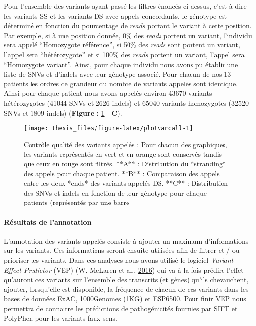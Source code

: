 \documentclass[12pt,twoside]{reedthesis}
\theoremstyle{definition}
\theoremstyle{definition}
\theoremstyle{remark}
\begin{document}
  Pour l'ensemble des variants ayant passé les filtres énoncés ci-dessus,
  c'est à dire les variants SS et les variants DS avec appels concordants,
  le génotype est déterminé en fonction du pourcentage de \emph{reads}
  portant le variant à cette position. Par exemple, si à une position
  donnée, 0\% des \emph{reads} portent un variant, l'individu sera appelé
  ``Homozygote référence'', si 50\% des \emph{reads} sont portent un
  variant, l'appel sera ``hétérozygote'' et si 100\% des \emph{reads}
  portent un variant, l'appel sera ``Homozygote variant''. Ainsi, pour
  chaque individu nous avons pu établir une liste de SNVs et d'indels avec
  leur génotype associé. Pour chacun de nos 13 patients les ordres de
  grandeur du nombre de variants appelés sont identique. Ainsi pour chaque
  patient nous avons appelés environ 43670 variants hétérozygotes (41044
  SNVs et 2626 indels) et 65040 variants homozygotes (32520 SNVs et 1809
  indels) (\textbf{Figure : }\ref{fig:plotvarcall} - \textbf{C}).
  
  \newpage
  
  \begin{figure}
  
  {\centering \texttt{[image: thesis\_files/figure-latex/plotvarcall-1]} 
  
  }
  
  \caption[Contrôle qualité des variants appelés]{Contrôle qualité des variants appelés : Pour chacun des graphiques, les variants représentés en vert et en orange sont conservés tandis que ceux en rouge sont filtrés. **A** : Distribution du *stranding* des appels pour chaque patient. **B** : Comparaison des appels entre les deux *ends* des variants appelés DS. **C** : Distribution des SNVs et indels en fonction de leur génotype pour chaque patients (représentés par une barre}\label{fig:plotvarcall}
  \end{figure}
  
  \newpage
  
  \paragraph{Résultats de l'annotation}\label{resultats-de-lannotation}
  
  L'annotation des variants appelés consiste à ajouter un maximum
  d'informations sur les variants. Ces informations seront ensuite
  utilisées afin de filtrer et / ou prioriser les variants. Dans ces
  analyses nous avons utilisé le logiciel \emph{Variant Effect Predictor}
  (VEP) (W. McLaren et al., \protect\hyperlink{ref-McLaren2016}{2016}) qui
  va à la fois prédire l'effet qu'auront ces variants sur l'ensemble des
  transcrits (et gènes) qu'ils chevauchent, ajouter, lorsqu'elle est
  disponible, la fréquence de chacun de ces variants dans les bases de
  données ExAC, 1000Genomes (1KG) et ESP6500. Pour finir VEP nous
  permettra de connaitre les prédictions de pathogénicités fournies par
  SIFT et PolyPhen pour les variants faux-sens.
  
\end{document}
